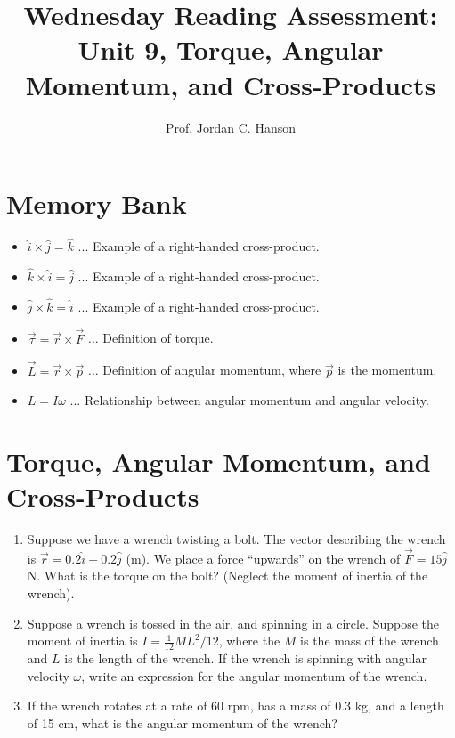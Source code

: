 \documentclass{article}
\begin{document}
\title{Wednesday Reading Assessment: Unit 9, Torque, Angular Momentum, and Cross-Products}
\author{Prof. Jordan C. Hanson}

\maketitle

\section{Memory Bank}

\begin{itemize}
\item $\hat{i} \times \hat{j} = \hat{k}$ ... Example of a right-handed cross-product.
\item $\hat{k} \times \hat{i} = \hat{j}$ ... Example of a right-handed cross-product.
\item $\hat{j} \times \hat{k} = \hat{i}$ ... Example of a right-handed cross-product.
\item $\vec{\tau} = \vec{r} \times \vec{F}$ ... Definition of torque.
\item $\vec{L} = \vec{r} \times \vec{p}$ ... Definition of angular momentum, where $\vec{p}$ is the momentum.
\item $L = I \omega$ ... Relationship between angular momentum and angular velocity.
\end{itemize}

\section{Torque, Angular Momentum, and Cross-Products}

\begin{enumerate}
\item Suppose we have a wrench twisting a bolt.  The vector describing the wrench is $\vec{r} = 0.2\hat{i}+0.2\hat{j}$ (m).  We place a force ``upwards'' on the wrench of $\vec{F} = 15\hat{j}$ N.  What is the torque on the bolt? (Neglect the moment of inertia of the wrench).  \\ \vspace{3cm}
\item Suppose a wrench is tossed in the air, and spinning in a circle.  Suppose the moment of inertia is $I = \frac{1}{12} ML^2/12$, where the $M$ is the mass of the wrench and $L$ is the length of the wrench.  If the wrench is spinning with angular velocity $\omega$, write an expression for the angular momentum of the wrench. \\ \vspace{2cm}
\item If the wrench rotates at a rate of 60 rpm, has a mass of 0.3 kg, and a length of 15 cm, what is the angular momentum of the wrench?
\end{enumerate}
\end{document}
